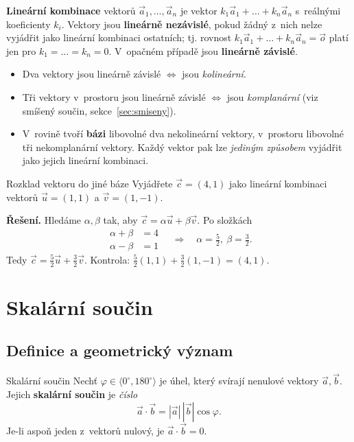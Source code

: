 \documentclass[a4paper,11pt]{article}
\newcommand{\abs}[1]{\left\lvert #1\right\rvert}
\begin{document}
\textbf{Lineární kombinace} vektorů $\vec a_1,\dots,\vec a_n$ je vektor
$k_1\vec a_1+\dots+k_n\vec a_n$ s~reálnými koeficienty $k_i$. Vektory jsou
\textbf{lineárně nezávislé}, pokud žádný z~nich nelze vyjádřit jako lineární kombinaci
ostatních; tj. rovnost $k_1\vec a_1+\dots+k_n\vec a_n=\vec o$ platí jen pro
$k_1=\dots=k_n=0$. V~opačném případě jsou \textbf{lineárně závislé}.

\begin{itemize}
  \item Dva vektory jsou lineárně závislé $\iff$ jsou \emph{kolineární}.
  \item Tři vektory v~prostoru jsou lineárně závislé $\iff$ jsou \emph{komplanární}
        (viz smíšený součin, sekce~\ref{sec:smiseny}).
  \item V~rovině tvoří \textbf{bázi} libovolné dva nekolineární vektory, v~prostoru
        libovolné tři nekomplanární vektory. Každý vektor pak lze \emph{jediným
        způsobem} vyjádřit jako jejich lineární kombinaci.
\end{itemize}

\begin{priklad}{Rozklad vektoru do jiné báze}
Vyjádřete $\vec c=(4,1)$ jako lineární kombinaci vektorů $\vec u=(1,1)$ a $\vec v=(1,-1)$.

\medskip\noindent\textbf{Řešení.} Hledáme $\alpha,\beta$ tak, aby
$\vec c=\alpha\vec u+\beta\vec v$. Po složkách
\[
  \begin{aligned}\alpha+\beta&=4\\ \alpha-\beta&=1\end{aligned}
  \quad\Longrightarrow\quad \alpha=\tfrac52,\ \beta=\tfrac32 .
\]
Tedy $\vec c=\tfrac52\vec u+\tfrac32\vec v$. Kontrola: $\tfrac52(1,1)+\tfrac32(1,-1)=(4,1)$. \checkmark
\end{priklad}

\section{Skalární součin}

\subsection{Definice a geometrický význam}

\begin{definice}{Skalární součin}
Nechť $\varphi\in\langle0^\circ,180^\circ\rangle$ je úhel, který svírají nenulové vektory
$\vec a,\vec b$. Jejich \textbf{skalární součin} je \emph{číslo}
\begin{equation}
  \vec a\cdot\vec b=\abs{\vec a}\,\abs{\vec b}\cos\varphi .
\end{equation}
Je-li aspoň jeden z~vektorů nulový, je $\vec a\cdot\vec b=0$.
\end{definice}
\end{document}
